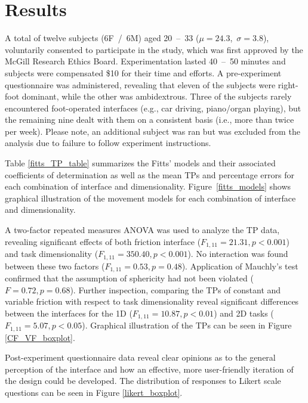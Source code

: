 \documentclass [12pt,letterpaper]{report}
\begin{document}

\section{Results}

A total of twelve subjects (6F~/~6M) aged 20~--~33 ($\mu=24.3$,~$\sigma=3.8$), voluntarily consented to participate in the study, which was first approved by the McGill Research Ethics Board. Experimentation lasted 40~--~50 minutes and subjects were compensated \$10 for their time and efforts. A pre-experiment questionnaire was administered, revealing that eleven of the subjects were right-foot dominant, while the other was ambidextrous. Three of the subjects rarely encountered foot-operated interfaces (e.g., car driving, piano/organ playing), but the remaining nine dealt with them on a consistent basis (i.e., more than twice per week). Please note, an additional subject was ran but was excluded from the analysis due to failure to follow experiment instructions.

Table \ref{fitts_TP_table} summarizes the Fitts' models and their associated coefficients of determination as well as the mean TPs and percentage errors for each combination of interface and dimensionality. Figure~\ref{fitts_models} shows graphical illustration of the movement models for each combination of interface and dimensionality.




A two-factor repeated measures ANOVA was used to analyze the TP data, revealing significant effects of both friction interface ($F_{1,11}=21.31, p<0.001$) and task dimensionality ($F_{1,11}=350.40, p<0.001$). No interaction was found between these two factors ($F_{1,11}=0.53, p=0.48$). Application of Mauchly's test confirmed that the assumption of sphericity had not been violated ($F=0.72, p=0.68$). Further inspection, comparing the TPs of constant and variable friction with respect to task dimensionality reveal significant differences between the interfaces for the 1D ($F_{1,11}=10.87, p<0.01$) and 2D tasks ($F_{1,11}=5.07, p<0.05$). Graphical illustration of the TPs can be seen in Figure \ref{CF_VF_boxplot}.

Post-experiment questionnaire data reveal clear opinions as to the general perception of the interface and how an effective, more user-friendly iteration of the design could be developed. The distribution of responses to Likert scale questions can be seen in Figure \ref{likert_boxplot}.
\end{document}
